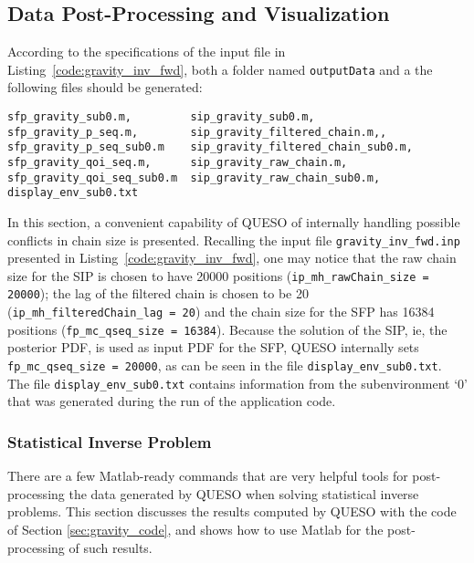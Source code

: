 \subsection{Data Post-Processing and Visualization}\label{sec:gravity-results}

 

According to the specifications of the input file in Listing~\ref{code:gravity_inv_fwd}, both a folder named \verb+outputData+ and a the following files should be generated:
\begin{verbatim}
sfp_gravity_sub0.m,         sip_gravity_sub0.m, 
sfp_gravity_p_seq.m,        sip_gravity_filtered_chain.m,,
sfp_gravity_p_seq_sub0.m    sip_gravity_filtered_chain_sub0.m,
sfp_gravity_qoi_seq.m,      sip_gravity_raw_chain.m,       
sfp_gravity_qoi_seq_sub0.m  sip_gravity_raw_chain_sub0.m,
display_env_sub0.txt 
\end{verbatim}



%

In this section, a convenient capability of QUESO of internally handling possible conflicts in chain size is presented. Recalling the input file \verb+gravity_inv_fwd.inp+ presented in Listing~\ref{code:gravity_inv_fwd}, one may notice that  the raw chain size for the SIP is chosen to have 20000 positions (\verb+ip_mh_rawChain_size = 20000+); the lag of the filtered chain is chosen to be 20 (\verb+ip_mh_filteredChain_lag = 20+) and the chain size for the SFP has 16384 positions (\verb+fp_mc_qseq_size = 16384+). Because the solution of the SIP, ie, the posterior PDF, is used as input PDF for the SFP, QUESO internally sets \verb+fp_mc_qseq_size = 20000+, as can be seen in the file \verb+display_env_sub0.txt+.  The file \verb+display_env_sub0.txt+ contains information from the subenvironment `0' that was generated during the run of the application code.

\subsubsection{Statistical Inverse Problem}

There are a few Matlab-ready commands that are very helpful tools for post-processing the data generated by QUESO when solving statistical inverse problems.
This section discusses the results computed by QUESO with the code of Section \ref{sec:gravity_code}, and shows how to use Matlab for the post-processing of such results.

